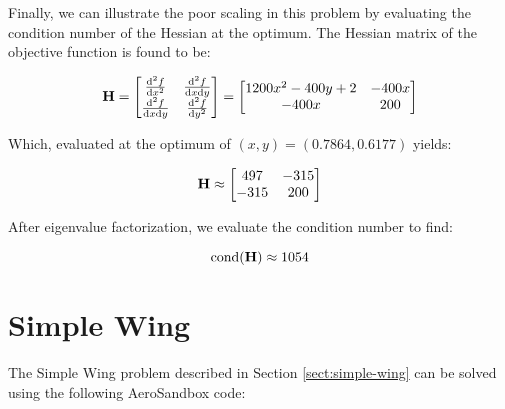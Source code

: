 Finally, we can illustrate the poor scaling in this problem by evaluating the condition number of the Hessian at the optimum. The Hessian matrix of the objective function is found to be:

\begin{equation}
    \mathbf{H} =
    \begin{bmatrix}
        \frac{\mathrm{d}^2 f}{\mathrm{d} x^2} & \frac{\mathrm{d}^2 f}{\mathrm{d} x \mathrm{d} y} \\
        \frac{\mathrm{d}^2 f}{\mathrm{d} x \mathrm{d} y} & \frac{\mathrm{d}^2 f}{\mathrm{d} y^2}
    \end{bmatrix} =
    \begin{bmatrix}
        1200x^2 - 400y + 2 & -400x \\
        -400x & 200
    \end{bmatrix}
\end{equation}

Which, evaluated at the optimum of $(x, y) = (0.7864, 0.6177)$ yields:

\begin{equation}
    \mathbf{H} \approx
    \begin{bmatrix}
        497 & -315 \\
        -315 & 200
    \end{bmatrix}
\end{equation}

After eigenvalue factorization, we evaluate the condition number to find:

\begin{equation}
    \mathrm{cond}(\mathbf{H}) \approx 1054
\end{equation}


\section{Simple Wing}
\label{sect:simple-wing-code}

The Simple Wing problem described in Section \ref{sect:simple-wing} can be solved using the following AeroSandbox code:

